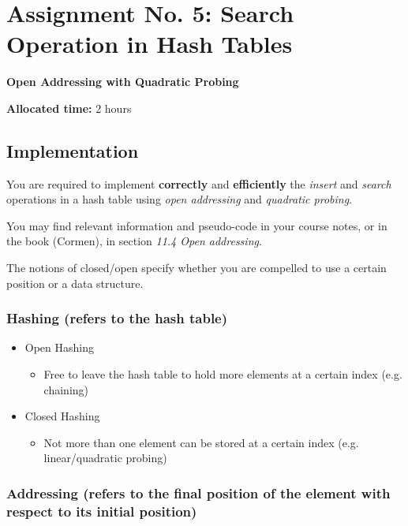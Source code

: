 \documentclass[../en-fa-lab.tex]{subfiles}
\begin{document}
\section{\texorpdfstring{\textbf{Assignment No. 5: Search Operation in Hash Tables}}{Assignment No. 5: Search Operation in Hash Tables}}\label{assign5}


\textbf{Open Addressing with Quadratic Probing}

\textbf{Allocated time:} 2 hours

\subsection{Implementation}\label{implementation}

You are required to implement \textbf{correctly} and
\textbf{efficiently} the \emph{insert} and \emph{search} operations in a
hash table using \emph{open addressing} and \emph{quadratic probing}.

You may find relevant information and pseudo-code in your course notes,
or in the book (Cormen), in section \emph{11.4 Open addressing}.

The notions of closed/open specify whether you are compelled to use a
certain position or a data structure.

\subsubsection{Hashing (refers to the hash
table)}\label{hashing-refers-to-the-hash-table}

\begin{itemize}
\item
  Open Hashing

  \begin{itemize}
  \item
    Free to leave the hash table to hold more elements at
    a certain index (e.g. chaining)
  \end{itemize}
\item
  Closed Hashing

  \begin{itemize}
  \item
    Not more than one element can be stored at a certain
    index (e.g. linear/quadratic probing)
  \end{itemize}
\end{itemize}

\subsubsection{Addressing (refers to the final position of the element with
respect to its initial
position)}\label{addressing-refers-to-the-final-position-of-the-element-with-respect-to-its-initial-position}
\end{document}
